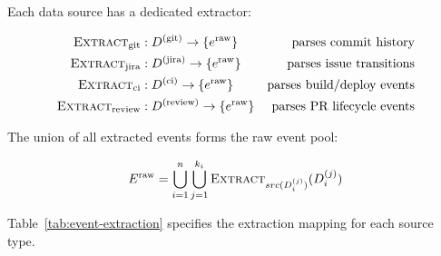 Each data source has a dedicated extractor:

\begin{definition}
\label{def:extractors}
\begin{align}
\textsc{Extract}_{\text{git}} &: D^{(\text{git})} \to \{e^{\text{raw}}\}
    & \text{parses commit history} \label{eq:extract-git} \\
\textsc{Extract}_{\text{jira}} &: D^{(\text{jira})} \to \{e^{\text{raw}}\}
    & \text{parses issue transitions} \label{eq:extract-jira} \\
\textsc{Extract}_{\text{ci}} &: D^{(\text{ci})} \to \{e^{\text{raw}}\}
    & \text{parses build/deploy events} \label{eq:extract-ci} \\
\textsc{Extract}_{\text{review}} &: D^{(\text{review})} \to \{e^{\text{raw}}\}
    & \text{parses PR lifecycle events} \label{eq:extract-review}
\end{align}
\end{definition}

The union of all extracted events forms the raw event pool:

\begin{equation}
\label{eq:raw-pool}
E^{\text{raw}} = \bigcup_{i=1}^{n} \bigcup_{j=1}^{k_i} 
    \textsc{Extract}_{src(D_i^{(j)})}(D_i^{(j)})
\end{equation}

Table~\ref{tab:event-extraction} specifies the extraction mapping for each 
source type.


